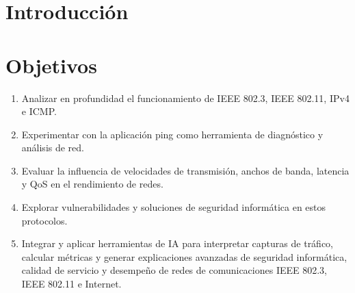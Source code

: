 \section{Introducción}

\section{Objetivos}
\begin{enumerate}
    \item Analizar en profundidad el funcionamiento de IEEE 802.3, IEEE 802.11, IPv4 e
    ICMP.
    \item Experimentar con la aplicación ping como herramienta de diagnóstico y análisis
    de red.
    \item Evaluar la influencia de velocidades de transmisión, anchos de banda,
    latencia y QoS en el rendimiento de redes.
    \item Explorar vulnerabilidades y soluciones de seguridad informática en estos
    protocolos.
    \item Integrar y aplicar herramientas de IA para interpretar capturas de tráfico,
    calcular métricas y generar explicaciones avanzadas de seguridad informática,
    calidad de servicio y desempeño de redes de comunicaciones IEEE 802.3, IEEE
    802.11 e Internet.
\end{enumerate}
